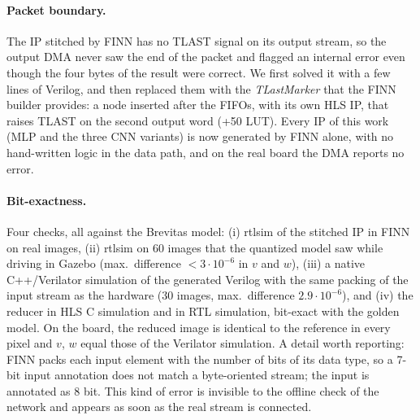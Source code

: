 \documentclass{article}
\begin{document}
\paragraph{Packet boundary.} The IP stitched by FINN has no TLAST signal on its output stream, so the output DMA never saw the end of the packet and flagged an
internal error even though the four bytes of the result were correct. We first solved it with a few lines of Verilog, and then replaced them with the \emph{TLastMarker}
that the FINN builder provides: a node inserted after the FIFOs, with its own HLS IP, that raises TLAST on the second output word (+50 LUT). Every IP of this work
(MLP and the three CNN variants) is now generated by FINN alone, with no hand-written logic in the data path, and on the real board the DMA reports no error.

\paragraph{Bit-exactness.} Four checks, all against the Brevitas model: (i) rtlsim of the stitched IP in FINN on real images,
(ii) rtlsim on 60 images that the quantized model saw while driving in Gazebo (max.\ difference $<3\cdot10^{-6}$ in $v$ and $w$),
(iii) a native C++/Verilator simulation of the generated Verilog with the same packing of the input stream as the hardware (30 images,
max.\ difference $2.9\cdot10^{-6}$), and (iv) the reducer in HLS C simulation and in RTL simulation, bit-exact with the golden model.
On the board, the reduced image is identical to the reference in every pixel and $v$, $w$ equal those of the Verilator simulation.
A detail worth reporting: FINN packs each input element with the number of bits of its data type, so a 7-bit input annotation does not match
a byte-oriented stream; the input is annotated as 8 bit. This kind of error is invisible to the offline check of the network and appears as soon as the real stream is connected.
\end{document}
